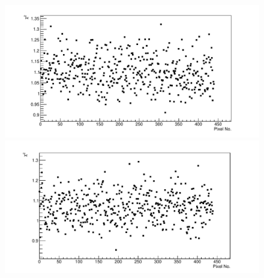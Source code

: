 \begin{figure}%
\includegraphics[width=\textwidth]{chapters/graphs/GainVarsMeas/LL_m04_2016-06-11/Set0and2/Chi2_AverageMethod_Signal_StandHV.pdf}
\caption{}
\vspace{3mm}
\includegraphics[width=\textwidth]{chapters/graphs/GainVarsMeas/LL_m04_2016-06-11/Set0and2/Chi2_AverageMethod_Signal_LowHV.pdf}
\caption{}
\end{figure}

